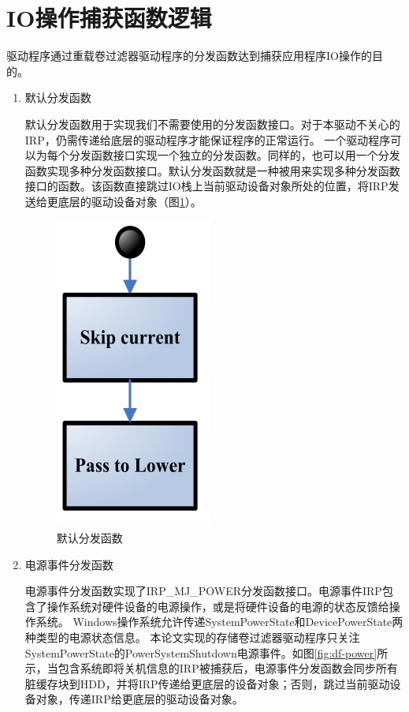 
\section{IO操作捕获函数逻辑}
\label{sec:capture_io_logic}

驱动程序通过重载卷过滤器驱动程序的分发函数达到捕获应用程序IO操作的目的。

\begin{enumerate}

\item 默认分发函数

默认分发函数用于实现我们不需要使用的分发函数接口。对于本驱动不关心的IRP，仍需传递给底层的驱动程序才能保证程序的正常运行。
一个驱动程序可以为每个分发函数接口实现一个独立的分发函数。同样的，也可以用一个分发函数实现多种分发函数接口。默认分发函数就是一种被用来实现多种分发函数接口的函数。该函数直接跳过IO栈上当前驱动设备对象所处的位置，将IRP发送给更底层的驱动设备对象（图\ref{fig:df-default}）。

\begin{figure}[h]
\centering
\includegraphics[width=0.2\linewidth]{./graph/df-default}
\caption{默认分发函数}
\label{fig:df-default}
\end{figure}

\item 电源事件分发函数

电源事件分发函数实现了IRP\_MJ\_POWER分发函数接口。电源事件IRP包含了操作系统对硬件设备的电源操作，或是将硬件设备的电源的状态反馈给操作系统。
Windows操作系统允许传递SystemPowerState和DevicePowerState两种类型的电源状态信息。
本论文实现的存储卷过滤器驱动程序只关注SystemPowerState的PowerSystemShutdown电源事件。如图\ref{fig:df-power}所示，当包含系统即将关机信息的IRP被捕获后，电源事件分发函数会同步所有脏缓存块到HDD，并将IRP传递给更底层的设备对象；否则，跳过当前驱动设备对象，传递IRP给更底层的驱动设备对象。


\end{enumerate}
